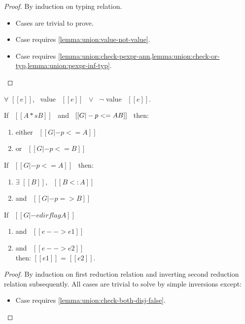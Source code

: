 \begin{proof}
By induction on typing relation.
  \begin{itemize}
    \item Cases  are trivial to prove.
    \item Case  requires \cref{lemma:union:value-not-value}.
    \item Case  requires 
    \cref{lemma:union:check-pexpr-ann,lemma:union:check-or-typ,lemma:union:pexpr-inf-typ}.
  \end{itemize}
\end{proof}

\begin{lemma}
\label{lemma:union:value-not-value}
$\forall$ $[[e]]$, \ value \ $[[e]]$ \ $\vee$ \ $\neg$ value \ $[[e]]$.
\end{lemma}

\begin{lemma}
\label{lemma:union:check-or-typ}
If \ $[[A *s B]]$ \ and \ $[[G |- p <= A \/ B]]$ \ then:
  \begin{enumerate}
    \item either \ $[[G |- p <= A]]$
    \item or \ $[[G |- p <= B]]$
  \end{enumerate}
\end{lemma}

\begin{lemma}
\label{lemma:union:pexpr-inf-typ}
If \ $[[G |- p <= A]]$ \ then:
  \begin{enumerate}
  \item $\exists$ $[[B]]$, \ $[[B <: A]]$
  \item and \ $[[G |- p => B]]$
  \end{enumerate}
\end{lemma}

\begin{lemma}[Determinism]
\label{lemma:union:determinism}
  If \ $[[G |- e dirflag A]]$
  \begin{enumerate}
  \item and \ $[[e --> e1]]$
  \item and \ $[[e --> e2]]$ \\
  then: $[[e1]]$ = $[[e2]]$.
  \end{enumerate}
\end{lemma}

\begin{proof}
  By induction on first reduction relation and inverting second reduction relation subsequently.
  All cases are trivial to solve by simple inversions except:
  \begin{itemize}
    \item Case  requires \cref{lemma:union:check-both-disj-false}.
  \end{itemize}
\end{proof}

